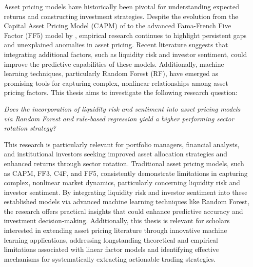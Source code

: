 Asset pricing models have historically been pivotal for understanding expected returns and constructing investment strategies. Despite the evolution from the Capital Asset Pricing Model (CAPM) of  to the advanced Fama-French Five Factor (FF5) model by , empirical research continues to highlight persistent gaps and unexplained anomalies in asset pricing. Recent literature suggests that integrating additional factors, such as liquidity risk and investor sentiment, could improve the predictive capabilities of these models. Additionally, machine learning techniques, particularly Random Forest (RF), have emerged as promising tools for capturing complex, nonlinear relationships among asset pricing factors. This thesis aims to investigate the following research question: 
\begin{center}
    \textit{Does the incorporation of liquidity risk and sentiment into asset pricing models via Random Forest and rule-based regression yield a higher performing sector rotation strategy?}
\end{center}

This research is particularly relevant for portfolio managers, financial analysts, and institutional investors seeking improved asset allocation strategies and enhanced returns through sector rotation. Traditional asset pricing models, such as CAPM, FF3, C4F, and FF5, consistently demonstrate limitations in capturing complex, nonlinear market dynamics, particularly concerning liquidity risk and investor sentiment. By integrating liquidity risk and investor sentiment into these established models via advanced machine learning techniques like Random Forest, the research offers practical insights that could enhance predictive accuracy and investment decision-making. Additionally, this thesis is relevant for scholars interested in extending asset pricing literature through innovative machine learning applications, addressing longstanding theoretical and empirical limitations associated with linear factor models and identifying effective mechanisms for systematically extracting actionable trading strategies.